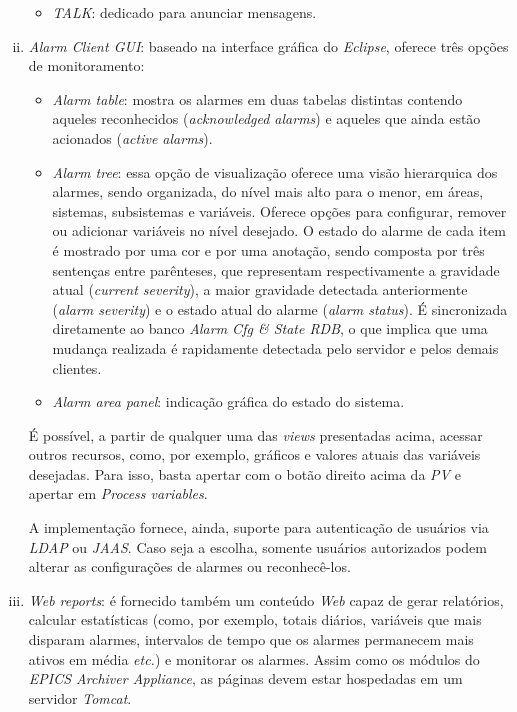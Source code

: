 \begin{enumerate}[i.]
\begin{itemize}
    \item \textit{TALK}: dedicado para anunciar mensagens.
    
  \end{itemize}
  
  \item \textit{Alarm Client GUI}: \label{client-gui} baseado na interface
  gráfica do \textit{Eclipse}, oferece três opções de monitoramento:
  
  \begin{itemize} \renewcommand\labelitemi{--}
    \item \textit{Alarm table}: mostra os alarmes em duas tabelas distintas
    contendo aqueles reconhecidos (\textit{acknowledged alarms}) e aqueles que
    ainda estão acionados (\textit{active alarms}).
    
    \item \textit{Alarm tree}: essa opção de visualização oferece
    uma visão hierarquica dos alarmes, sendo organizada, do nível mais alto para
    o menor, em áreas, sistemas, subsistemas e variáveis. Oferece opções para
    configurar, remover ou adicionar variáveis no nível desejado. O estado do
    alarme de cada item é mostrado por uma cor e por uma anotação, sendo
    composta por três sentenças entre parênteses, que representam
    respectivamente a gravidade atual (\textit{current severity}), a
    maior gravidade detectada anteriormente (\textit{alarm severity}) e o estado
    atual do alarme (\textit{alarm status}). É sincronizada diretamente ao banco
    \textit{Alarm Cfg \& State RDB}, o que implica que uma mudança realizada é
    rapidamente detectada pelo servidor e pelos demais clientes.
    
    \item \textit{Alarm area panel}: indicação gráfica do estado do sistema.
    
  \end{itemize}
  
  É possível, a partir de qualquer uma das \textit{views} presentadas acima,
  acessar outros recursos, como, por exemplo, gráficos e valores atuais das
  variáveis desejadas. Para isso, basta apertar com o botão direito acima da
  \textit{PV} e apertar em \textit{Process variables}.
  
  \vspace{12pt}
  
  A implementação fornece, ainda, suporte para autenticação de usuários via
  \textit{LDAP} ou \textit{JAAS}. Caso seja a escolha, somente usuários
  autorizados podem alterar as configurações de alarmes ou reconhecê-los.
  
  \item \textit{Web reports}: é fornecido também um conteúdo \textit{Web} capaz
  de gerar relatórios, calcular estatísticas (como, por exemplo, totais
  diários, variáveis que mais disparam alarmes, intervalos de tempo que os
  alarmes permanecem mais ativos em média \textit{etc.}) e monitorar os alarmes.
  Assim como os módulos do \textit{EPICS Archiver Appliance}, as páginas devem estar hospedadas em um
  servidor \textit{Tomcat}.
  
\end{enumerate}

